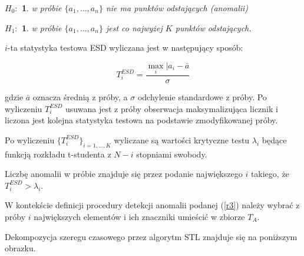 \documentclass{article}
\begin{document}
\newtheorem{nullhypothesis}{$H_0\colon$}
\newtheorem{althypothesis}{$H_1\colon$}

\begin{nullhypothesis}
  w próbie \(\{a_1, \dots, a_{n}\}\) nie ma punktów odstających (anomalii) 
\end{nullhypothesis}

\begin{althypothesis} 
  w próbie \(\{a_1, \dots, a_{n}\}\) jest co najwyżej \(K\) punktów odstających.
\end{althypothesis}


\(i\)-ta statystyka testowa ESD wyliczana jest w następujący sposób:

\begin{equation*}
T^{ESD}_{i} = \frac{\max_{i}|a_{i} - \bar a}{\sigma}
\end{equation*}

gdzie \(\bar{a}\) oznacza średnią z próby, a \(\sigma\) odchylenie
standardowe z próby. Po wyliczeniu \(T^{ESD}_{i}\) usuwana jest z próby
obserwacja maksymalizująca licznik i liczona jest kolejna statystyka
testowa na podstawie zmodyfikowanej próby.

Po wyliczeniu \(\{T^{ESD}_{i}\}_{i = 1, \dots, K}\) wyliczane są
wartości krytyczne testu \(\lambda_{i}\) będące funkcją rozkładu
t-studenta z \(N - i\) stopniami swobody.

Liczbę anomalii w próbie znajduje się przez podanie największego \(i\)
takiego, że \(T^{ESD}_{i} > \lambda_{i}\).

W kontekście definicji procedury detekcji anomalii podanej (\ref{r3})
należy wybrać z próby \(i\) największych elementów i ich znaczniki
umieścić w zbiorze \(T_{A}\).

Dekompozycja szeregu czasowego przez algorytm STL znajduje się na
poniższym obrazku.
\end{document}
